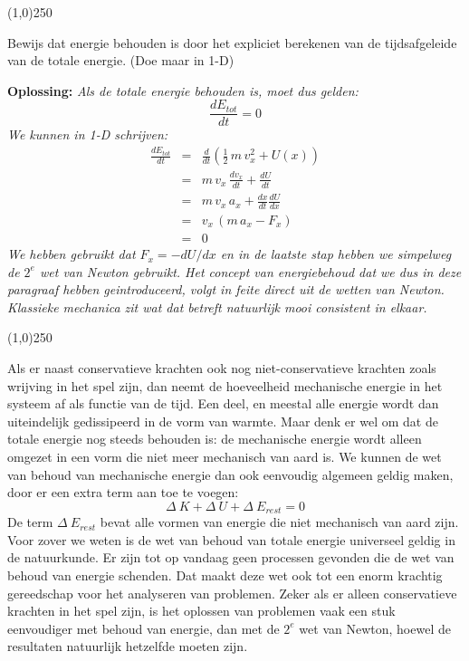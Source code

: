 \begin{center}
\line(1,0){250}
\end{center}
\begin{voorbeeld} 
Bewijs dat energie behouden is door het expliciet berekenen van de tijdsafgeleide van de totale energie. (Doe maar in 1-D)

{\bf Oplossing: }{\it Als de totale energie behouden is, moet dus gelden:
\begin{equation}
\frac{dE_{tot}}{dt} = 0
\end{equation}
We kunnen in 1-D schrijven:
\begin{eqnarray}
\frac{dE_{tot}}{dt} & = & \frac{d}{dt}\left(\frac{1}{2}\,m\,v_x^2+U(x)\right) \\
                                & = & m\,v_x\,\frac{d v_x}{dt} + \frac{dU}{dt} \\
                                & = & m\,v_x\,a_x + \frac{dx}{dt}\frac{dU}{dx} \\
                                & = & v_x\,\left(m\,a_x - F_x\right) \\
                                & = & 0
\end{eqnarray}
We hebben gebruikt dat $F_x=-dU/dx$ en in de laatste stap hebben we simpelweg
de $2^e$ wet van Newton gebruikt. Het concept van energiebehoud dat we dus in deze
paragraaf hebben geintroduceerd, volgt in feite direct uit de wetten van Newton. Klassieke
mechanica zit wat dat betreft natuurlijk mooi consistent in elkaar.
} 
\end{voorbeeld}
\begin{center}
\line(1,0){250}
\end{center}

Als er naast conservatieve krachten ook nog niet-conservatieve krachten zoals
wrijving in het spel zijn, dan neemt de hoeveelheid mechanische energie in het systeem af als 
functie van de tijd. Een deel, en meestal alle energie wordt dan uiteindelijk gedissipeerd in
de vorm van warmte. Maar denk er wel om dat de totale energie
nog steeds behouden is: de mechanische energie wordt alleen omgezet in een vorm die
niet meer mechanisch van aard is. We kunnen de wet van behoud van mechanische
energie dan ook eenvoudig algemeen geldig maken, door er een extra term aan toe te voegen:
\begin{equation}
\Delta~K+\Delta~U +\Delta~E_{rest} = 0
\end{equation}
De term $\Delta~E_{rest}$ bevat alle vormen van energie die niet mechanisch van aard zijn.
Voor zover we weten is de wet van behoud van totale energie universeel geldig in de natuurkunde.
Er zijn tot op vandaag geen processen gevonden die de wet van behoud van energie schenden. 
Dat maakt deze wet ook tot een enorm krachtig gereedschap voor het analyseren van 
problemen. Zeker als er alleen conservatieve krachten in het spel zijn, is het oplossen
van problemen vaak een stuk eenvoudiger met behoud van energie, dan met de $2^e$ wet
van Newton, hoewel de resultaten natuurlijk hetzelfde moeten zijn.

